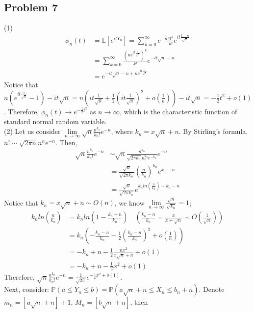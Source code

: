 \documentclass[12pt]{article}
\begin{document}
	\subsection*{Problem 7}
(1)
\begin{align*}
\phi_{n}(t)&=\mathbb{E}[e^{itY_{n}}]=\sum_{k=0}^{\infty}e^{-n}\frac{n^k}{k!}e^{it\frac{k-n}{\sqrt{n}}}\\
&=\sum_{k=0}^{\infty}\frac{(ne^{it\frac{1}{\sqrt{n}}})^{k}}{k!}e^{-it\sqrt{n}-n}\\
&=e^{-it\sqrt{n}-n+ne^{it\frac{1}{\sqrt{n}}}}
\end{align*}
Notice that $n(e^{it\frac{1}{\sqrt{n}}}-1)-it\sqrt{n}=n(it\frac{1}{\sqrt{n}}+\frac{1}{2}(it\frac{1}{\sqrt{n}})^2+o(\frac{1}{n}))-it\sqrt{n}=-\frac{1}{2}t^2+o(1)$. Therefore, $\phi_{n}(t)\rightarrow e^{-\frac{1}{2}t^2}$ as $n\rightarrow\infty$, which is the characteristic function of standard normal random variable.\\
(2) Let us consider $\lim\limits_{n\rightarrow\infty}\sqrt{n}\frac{n^{k_{n}}}{k_{n}!}e^{-n}$, where $k_{n}=x\sqrt{n}+n$. By Stirling's formula, $n!\sim\sqrt{2\pi n}n^{n}e^{-n}$. Then,
\begin{align*}
\sqrt{n}\frac{n^{k_{n}}}{k_{n}!}e^{-n} &\sim \sqrt{n}\frac{n^{k_{n}}}{\sqrt{2\pi k_{n}}k_{n}^{k_{n}}e^{-k_{n}}} e^{-n}\\
&=\frac{\sqrt{n}}{\sqrt{2\pi k_{n}}}(\frac{n}{k_{n}})^{k_{n}}e^{k_{n}-n}\\
&=\frac{\sqrt{n}}{\sqrt{2\pi k_{n}}}e^{k_{n}ln(\frac{n}{k_{n}})+k_{n}-n}
\end{align*}
Notice that $k_{n}=x\sqrt{n}+n\sim O(n)$, we know $\lim\limits_{n\rightarrow\infty}\frac{\sqrt{n}}{\sqrt{k_{n}}}=1$;
\begin{align*}
	k_{n}ln(\frac{n}{k_{n}})&=k_{n}ln(1-\frac{k_{n}-n}{k_{n}})\quad(\frac{k_{n}-n}{k_{n}}=\frac{x}{x+\sqrt{n}}\sim O(\frac{1}{\sqrt{n}}))\\
	&=k_{n}(-\frac{k_{n}-n}{k_{n}}-\frac{1}{2}(\frac{k_{n}-n}{k_{n}})^{2}+o(\frac{1}{n}))\\
	&=-k_{n}+n-\frac{1}{2}\frac{n x^2}{x\sqrt{n}+n}+o(1)\\
	&=-k_{n}+n-\frac{1}{2}x^2+o(1)
\end{align*}
Therefore, $\sqrt{n}\frac{n^{k_{n}}}{k_{n}!}e^{-n}=\frac{1}{\sqrt{2\pi}}e^{-\frac{1}{2}x^2+o(1)}$.\\
Next, consider: $\mathbb{P}(a\leqslant Y_{n}\leqslant b)=\mathbb{P}(a\sqrt{n}+n\leqslant X_{n}\leqslant b_{n}+n)$. Denote $m_{n}=[a\sqrt{n}+n]+1$, $M_{n}=[b\sqrt{n}+n]$, then
\end{document}
